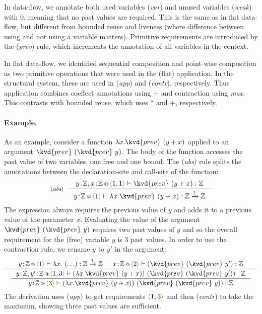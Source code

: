 In data-flow, we annotate both used variables (\emph{var}) and unused variables (\emph{weak}) with
$0$, meaning that no past values are required. This is the same as in flat data-flow, but different
from bounded reuse and liveness (where difference between using and not using a variable matters).
Primitive requirements are introduced by the (\emph{prev}) rule, which increments the annotation of
all variables in the context.

In flat data-flow, we identified sequential composition and point-wise composition as two primitive
operations that were used in the (flat) application. In the structural system, these are used in 
(\emph{app}) and (\emph{contr}), respectively. Thus application combines coeffect annotations using
$+$ and contraction using \emph{max}. This contrasts with bounded reuse, which uses $\ast$ and $+$,
respectively.

\paragraph{Example.} As an example, consider a function $\lambda x.\kvd{prev}~(y+x)$ applied to an argument
$\kvd{prev}~(\kvd{prev}~y)$. The body of the function accesses the past value of two variables, one free
and one bound. The (\emph{abs}) rule splits the annotations between the declaration-site and call-site
of the function:
%
\begin{equation*}
\tyrule{abs}
  {\coctx{y\!:\!\mathbb{Z}, x\!:\!\mathbb{Z}}{\alift{1, 1}} \vdash \kvd{prev}~(y+x) : \mathbb{Z} }
  {\coctx{y\!:\!\mathbb{Z}}{\alift{1}} \vdash \lambda x . \kvd{prev}~(y+x) : \mathbb{Z} \xrightarrow{\cclrd{1}} \mathbb{Z} }
\end{equation*}
%
The expression always requires the previous value of $y$ and adds it to a previous value of the 
parameter $x$. Evaluating the value of the argument $\kvd{prev}~(\kvd{prev}~y)$ requires two past 
values of $y$ and so the overall requirement for the (free) variable $y$ is $3$ past values. In 
order to use the contraction rule, we rename $y$ to $y'$ in the argument:
%
\begin{equation*}
\inference
  { \coctx{y\!:\!\mathbb{Z}}{\alift{1} } \vdash \lambda x.~(\ldots) : \mathbb{Z} \xrightarrow{\cclrd{1}} \mathbb{Z} &
    \coctx{x\!:\!\mathbb{Z}}{\alift{2}} \vdash (\kvd{prev}~(\kvd{prev}~y') : \mathbb{Z} }
{\inference
  { \coctx{y\!:\!\mathbb{Z}, y'\!:\!\mathbb{Z}}{\alift{1,3}} \vdash (\lambda x.\kvd{prev}~(y+x))~(\kvd{prev}~(\kvd{prev}~y')) : \mathbb{Z} }
  { \coctx{y\!:\!\mathbb{Z}}{\alift{3}} \vdash (\lambda x.\kvd{prev}~(y+x))~(\kvd{prev}~(\kvd{prev}~y)) : \mathbb{Z} } }
\end{equation*}
%
The derivation uses (\emph{app}) to get requirements $\alift{1,3}$ and then (\emph{contr}) to take 
the maximum, showing three past values are sufficient. 

